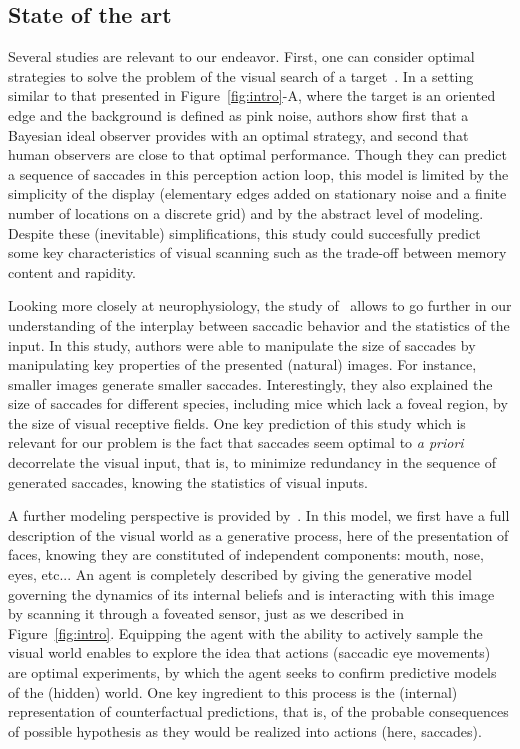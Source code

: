 \subsection{State of the art}
Several studies are relevant to our endeavor. First, one can consider optimal strategies to solve the problem of the visual search of a target~\citep{Najemnik05}. In a setting similar to that presented in Figure~\ref{fig:intro}-A, where the target is an oriented edge and the background is defined as pink noise, authors show first that a Bayesian ideal observer provides with an optimal strategy, and second that human observers are close to that optimal performance. Though they can predict a sequence of saccades in this perception action loop, this model is limited by the simplicity of the display (elementary edges added on stationary noise and a finite number of locations on a discrete grid) and by the abstract level of modeling. Despite these (inevitable) simplifications, this study could succesfully predict some key characteristics of visual scanning such as the trade-off between memory content and rapidity.

Looking more closely at neurophysiology, the study of~\citep{Samonds18} allows to go further in our understanding of the interplay between saccadic behavior and the statistics of the input. In this study, authors were able to manipulate the size of saccades by manipulating key properties of the presented (natural) images. For instance, smaller images generate smaller saccades. Interestingly, they also explained the size of saccades for different species, including mice which lack a foveal region, by the size of visual receptive fields. One key prediction of this study which is relevant for our problem is the fact that saccades seem optimal to \emph{a priori} decorrelate the visual input, that is, to minimize redundancy in the sequence of generated saccades, knowing the statistics of visual inputs.

A further modeling perspective is provided by~\citep{Friston12}. In this model, we first have a full description of the visual world as a generative process, here of the presentation of faces, knowing they are constituted of independent components: mouth, nose, eyes, etc... An agent is completely described by giving the generative model governing the dynamics of its internal beliefs and is interacting with this image by scanning it through a foveated sensor, just as we described in Figure~\ref{fig:intro}. Equipping the agent with the ability to actively sample the visual world enables to explore the idea that actions (saccadic eye movements) are optimal experiments, by which the agent seeks to confirm predictive models of the (hidden) world. One key ingredient to this process is the (internal) representation of counterfactual predictions, that is, of the probable consequences of possible hypothesis as they would be realized into actions (here, saccades).

